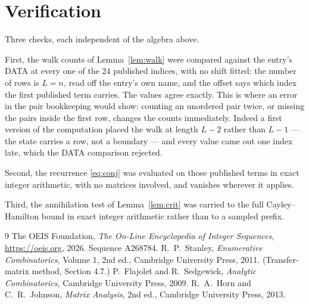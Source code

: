 \documentclass[11pt,a4paper]{article}
\theoremstyle{plain}
\theoremstyle{definition}
\begin{document}
\section{Verification}

Three checks, each independent of the algebra above.

First, the walk counts of Lemma~\ref{lem:walk} were compared against the entry's DATA at
every one of the $24$ published indices, with no shift fitted: the number of rows is
$L=n$, read off the entry's own name, and the offset says which index the first
published term carries. The values agree exactly. This is where an error in the pair
bookkeeping would show: counting an unordered pair twice, or missing the pairs inside the
first row, changes the counts immediately. Indeed a first version of the computation
placed the walk at length $L-2$ rather than $L-1$ --- the state carries a row, not a
boundary --- and every value came out one index late, which the DATA comparison rejected.

Second, the recurrence \eqref{eq:conj} was evaluated on those published terms in exact
integer arithmetic, with no matrices involved, and vanishes wherever it applies.

Third, the annihilation test of Lemma~\ref{lem:crit} was carried to the full
Cayley--Hamilton bound in exact integer arithmetic rather than to a sampled prefix.

\begin{thebibliography}{9}
 The OEIS Foundation, \emph{The On-Line Encyclopedia of Integer
Sequences}, \url{https://oeis.org}, 2026. Sequence A268784.
 R.~P.~Stanley, \emph{Enumerative Combinatorics}, Volume 1, 2nd ed.,
Cambridge University Press, 2011. (Transfer-matrix method, Section 4.7.)
 P.~Flajolet and R.~Sedgewick, \emph{Analytic Combinatorics}, Cambridge
University Press, 2009.
 R.~A.~Horn and C.~R.~Johnson, \emph{Matrix Analysis}, 2nd ed., Cambridge
University Press, 2013.
\end{thebibliography}
\end{document}

